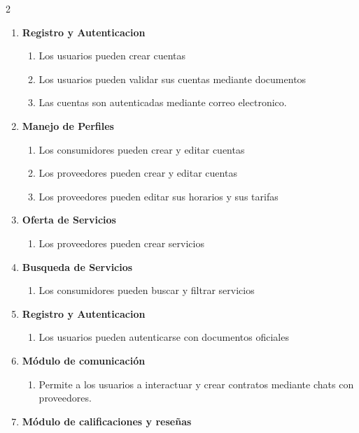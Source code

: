 \documentclass{article}
\begin{document}
  \begin {multicols}{2}
    \begin{enumerate}
      \item \textbf{Registro y Autenticacion}
        \begin{enumerate}
          \item Los usuarios pueden crear cuentas
          \item Los usuarios pueden validar sus cuentas mediante documentos
          \item Las cuentas son autenticadas mediante correo electronico.
        \end{enumerate}
      \item \textbf{Manejo de Perfiles}
        \begin{enumerate}
          \item Los consumidores pueden crear y editar cuentas
          \item Los proveedores pueden crear  y editar cuentas
          \item Los proveedores pueden editar sus horarios y sus tarifas
        \end{enumerate}
      \item \textbf{Oferta de Servicios}
        \begin{enumerate}
          \item Los proveedores pueden crear servicios
        \end{enumerate}
      \item \textbf{Busqueda de Servicios}
        \begin{enumerate}
          \item Los consumidores pueden buscar y filtrar servicios
        \end{enumerate}
      \item \textbf{Registro y Autenticacion}
        \begin{enumerate}
          \item Los usuarios pueden autenticarse con documentos oficiales
        \end{enumerate}
      \item \textbf{Módulo de comunicación } 
        \begin{enumerate}
          \item Permite a los usuarios a interactuar y crear contratos mediante chats con proveedores. 
        \end{enumerate}
      \item \textbf{Módulo de calificaciones y reseñas   }

\end{enumerate}
\end{multicols}
\end{document}
